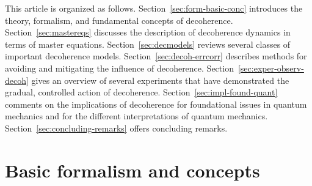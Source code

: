 \documentclass[3p,sort&compress]{elsarticle}
\begin{document}
This article is organized as follows. Section~\ref{sec:form-basic-conc} introduces the theory, formalism, and fundamental concepts of decoherence. Section~\ref{sec:mastereqs} discusses the description of decoherence dynamics in terms of master equations. Section~\ref{sec:decmodels} reviews several classes of important decoherence models. Section~\ref{sec:decoh-errcorr} describes methods for avoiding and mitigating the influence of decoherence. Section~\ref{sec:exper-observ-decoh} gives an overview of several experiments that have demonstrated the gradual, controlled action of decoherence. Section~\ref{sec:impl-found-quant} comments on the implications of decoherence for foundational issues in quantum mechanics and for the different interpretations of quantum mechanics. Section~\ref{sec:concluding-remarks} offers concluding remarks.

\section{\label{sec:form-basic-conc}Basic formalism and concepts}
\end{document}
